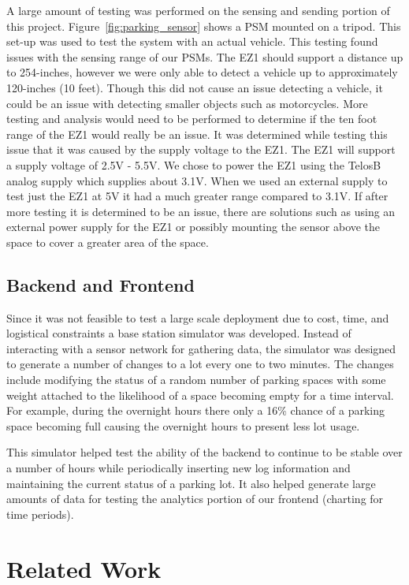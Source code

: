\documentclass{acm_proc}
\begin{document}
A large amount of testing was performed on the sensing and sending portion
of this project.
Figure~\ref{fig:parking_sensor} shows a PSM mounted on a
tripod.
This set-up was used to test the system with an actual vehicle.
This testing found issues with the sensing range of our PSMs.
The EZ1 should support a distance up to 254-inches, however we
were only able to detect a vehicle up to approximately 120-inches (10
feet).
Though this did not cause an issue detecting a vehicle, it could be an
issue with detecting smaller objects such as motorcycles.
More testing and analysis would need to be performed to determine if the
ten foot range of the EZ1 would really be an issue.
It was determined while testing this issue that it was caused by the supply
voltage to the EZ1.
The EZ1 will support a supply voltage of 2.5V - 5.5V.
We chose to power the EZ1 using the TelosB analog supply which
supplies about 3.1V.
When we used an external supply to test just the EZ1 at 5V it had a much
greater range compared to 3.1V.
If after more testing it is determined to be an issue, there are solutions
such as using an external power supply for the EZ1 or possibly mounting the
sensor above the space to cover a greater area of the space. 

\subsection{Backend and Frontend}

Since it was not feasible to test a large scale deployment due to cost,
time, and logistical constraints a base station simulator was developed.
Instead of interacting with a sensor network for gathering data, the
simulator was designed to generate a number of changes to a lot every one
to two minutes.
The  changes include modifying the status of a random number of parking
spaces with some weight attached to the likelihood of a space becoming empty
for a time interval.
For example, during the overnight hours there only a 16\% chance of a
parking space becoming full causing the overnight hours to present less lot
usage.

This simulator helped test the ability of the backend to continue to be
stable over a number of hours while periodically inserting new log
information and maintaining the current status of a parking lot.
It also helped generate large amounts of data for testing the analytics
portion of our frontend (charting for time periods).

\section{Related Work}\label{sec:related}
\end{document}
